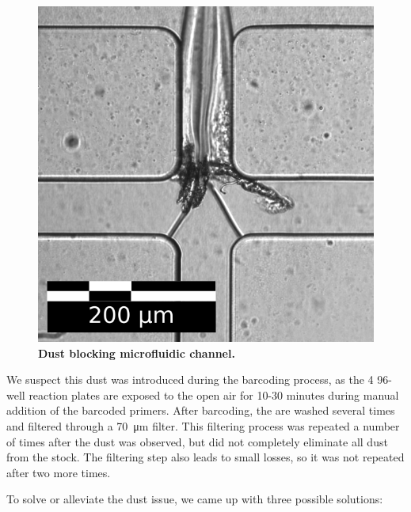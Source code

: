 \begin{figure}
\vspace{-15pt}
\centering
\includegraphics[width=\textwidth/3]{./ims/indrop_dust.png}
\caption[Dust blocking microfluidic channel]{\textbf{Dust blocking microfluidic channel.}}
\label{fig:indrop_dust}
\vspace{-35pt}
\end{figure}

We suspect this dust was introduced during the barcoding process, as the 4 96-well reaction plates are exposed to the open air for 10-30 minutes during manual addition of the barcoded primers. After barcoding, the  are washed several times and filtered through a \SI{70}{\um} filter. This filtering process was repeated a number of times after the dust was observed, but did not completely eliminate all dust from the stock. The filtering step also leads to small losses, so it was not repeated after two more times.\pms

To solve or alleviate the dust issue, we came up with three possible solutions:

